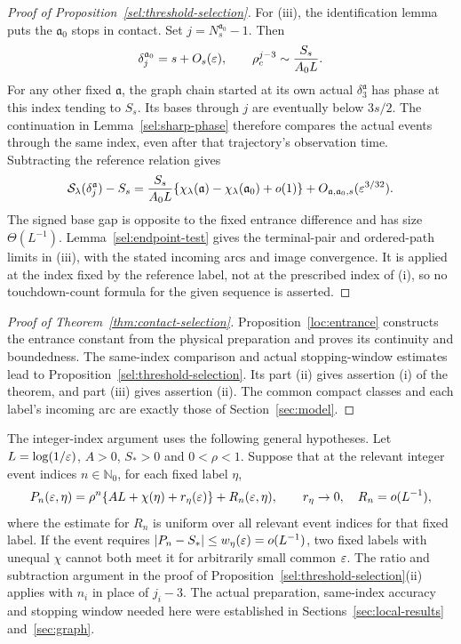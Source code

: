 \begin{proof}[Proof of Proposition~\ref{sel:threshold-selection}]
For \textup{(iii)}, the identification lemma
puts the $\mathfrak a_0$ stops in contact. Set
$j=N_s^{\mathfrak a_0}-1$. Then
\[
 \delta_j^{\mathfrak a_0}=s+O_s(\varepsilon),\qquad
 \rho_c^{j-3}\sim\frac{S_s}{A_0L}.
\]
For any other fixed $\mathfrak a$, the graph chain started at its
own actual $\delta_3^{\mathfrak a}$ has phase at this index tending
to $S_s$. Its bases through $j$ are eventually below $3s/2$.
The continuation in Lemma~\ref{sel:sharp-phase} therefore compares
the actual events through the same index, even after that
trajectory's observation time. Subtracting the reference relation
gives
\begin{equation}
 \mathcal S_\lambda(\delta_j^{\mathfrak a})-S_s
 =\frac{S_s}{A_0L}
   \{\chi_\lambda(\mathfrak a)
       -\chi_\lambda(\mathfrak a_0)+o(1)\}
       +O_{\mathfrak a,\mathfrak a_0,s}(\varepsilon^{3/32}).
 \label{sel:separation}
\end{equation}
The signed base gap is opposite to the fixed entrance difference
and has size $\Theta(L^{-1})$. Lemma~\ref{sel:endpoint-test} gives
the terminal-pair and ordered-path limits in \textup{(iii)}, with
the stated incoming arcs and image convergence. It is applied at the
index fixed by the reference label, not at the prescribed index of
\textup{(i)}, so no touchdown-count formula for the given sequence is
asserted.
\end{proof}

\begin{proof}[Proof of Theorem~\ref{thm:contact-selection}]
Proposition~\ref{loc:entrance} constructs the entrance constant from
the physical preparation and proves its continuity and boundedness.
The same-index comparison and actual stopping-window estimates lead
to Proposition~\ref{sel:threshold-selection}. Its part
\textup{(ii)} gives assertion \textup{(i)} of the theorem, and
part \textup{(iii)} gives assertion \textup{(ii)}. The common compact classes
and each label's incoming arc are exactly those of
Section~\ref{sec:model}.
\end{proof}

\begin{remark}
\label{sel:criterion}
The integer-index argument uses the following general hypotheses.
Let $L=\log(1/\varepsilon)$, $A>0$, $S_*>0$ and $0<\rho<1$.
Suppose that at the relevant integer event indices
$n\in\mathbb N_0$, for each fixed label $\eta$,
\[
 P_n(\varepsilon,\eta)
   =\rho^n\{AL+\chi(\eta)+r_\eta(\varepsilon)\}+R_n(\varepsilon,\eta),
 \qquad r_\eta\to0,\quad R_n=o(L^{-1}),
\]
where the estimate for $R_n$ is uniform over all relevant event
indices for that fixed label. If the event requires
$|P_n-S_*|\le w_\eta(\varepsilon)=o(L^{-1})$, two fixed labels with
unequal $\chi$ cannot both meet it for arbitrarily small common
$\varepsilon$. The ratio and subtraction argument in the proof of
Proposition~\ref{sel:threshold-selection}\textup{(ii)} applies with
$n_i$ in place of $j_i-3$.
The actual preparation, same-index accuracy and stopping window
needed here were established in Sections~\ref{sec:local-results}
and~\ref{sec:graph}.
\end{remark}

